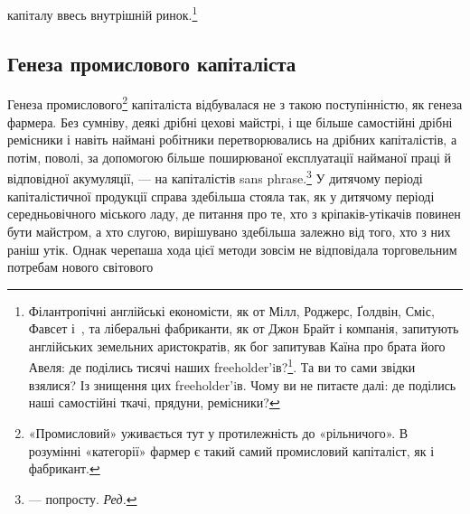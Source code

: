 капіталу ввесь внутрішній ринок.\footnote{
Філантропічні англійські економісти, як от Мілл, Роджерс, Ґолдвін,
Сміс, Фавсет і~, та ліберальні фабриканти, як от Джон Брайт
і компанія, запитують англійських земельних аристократів, як бог
запитував Каїна про брата його Авеля: де поділись тисячі наших freeholder’iв?\footnote*{
— самостійних селян. \emph{Ред.}
}.
Та ви то сами звідки взялися? Із знищення цих freeholder’iв.
Чому ви не питаєте далі: де поділись наші самостійні ткачі, прядуни,
ремісники?
}

\subsection{Генеза промислового капіталіста}

Генеза промислового\footnote{
«Промисловий» уживається тут у протилежність до «рільничого».
В розумінні «категорії» фармер є такий самий промисловий капіталіст,
як і фабрикант.
} капіталіста відбувалася не з такою
поступінністю, як генеза фармера. Без сумніву, деякі дрібні
цехові майстрі, і ще більше самостійні дрібні ремісники і навіть
наймані робітники перетворювались на дрібних капіталістів,
а потім, поволі, за допомогою більше поширюваної експлуатації
найманої праці й відповідної акумуляції, — на капіталістів sans
phrase.\footnote*{
— попросту. \emph{Ред.}
} У дитячому періоді капіталістичної продукції справа
здебільша стояла так, як у дитячому періоді середньовічного
міського ладу, де питання про те, хто з кріпаків-утікачів повинен
бути майстром, а хто слугою, вирішувано здебільша залежно
від того, хто з них раніш утік. Однак черепаша хода цієї методи
зовсім не відповідала торговельним потребам нового світового
\parbreak{}  %
